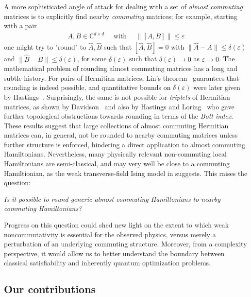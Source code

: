 \documentclass[a4paper,onecolumn,11pt]{quantumarticle}
\theoremstyle{plain}
\newcommand{\eps}{\varepsilon}
\begin{document}
A more sophisticated angle of attack for dealing with a set of \emph{almost commuting} matrices is to explicitly find nearby \emph{commuting} matrices; for example, starting with a pair
\begin{align}
A,B \in \mathbb{C}^{d \times d}\quad \text{ with } \quad \|[A,B]\| \leq \eps    
\end{align}
one might try to "round" to $\hat{A},\hat{B}$ such that $[\hat A,\hat B]=0$ with $\|\hat A-A\| \leq \delta(\eps)$ and
$\|\hat B-B\| \leq \delta(\eps)$, for some $\delta(\eps)$ such that $\delta(\eps) \rightarrow 0$ as $\eps \rightarrow 0$.
The mathematical problem of rounding almost commuting matrices has a long and subtle history.  For pairs of 
Hermitian matrices, Lin's theorem~\cite{Lin1997} guarantees that rounding is indeed possible, and
quantitative bounds on $\delta(\eps)$ were later given by Hastings~\cite{Hastings_2009,herrera2022hastingsapproachlinstheorem}.  
Surprisingly, the same is not possible for \emph{triplets} of Hermitian matrices, as shown by Davidson~\cite{Davidson1985} and also by 
Hastings and Loring~\cite{Hastings_2010} who gave further topological obstructions towards rounding in terms of the \emph{Bott index}. These results suggest that large collections of almost commuting Hermitian matrices can, in general, not be rounded to nearby commuting matrices unless further structure is enforced, hindering a direct application to almost commuting Hamiltonians. Nevertheless, many physically relevant non-commuting local Hamiltonians are semi-classical, and may very well be close to a commuting Hamiltionian, as the weak transverse-field Ising model in  suggests. This raises the question:
\begin{center}
\emph{Is it possible to round generic almost commuting Hamiltonians
to nearby commuting Hamiltonians?}
\end{center}



Progress on this question could shed new light on the extent to which weak noncommutativity is essential for the observed physics, versus merely a perturbation of an underlying commuting structure. Moreover, from a complexity perspective, it would allow us to better understand the boundary between classical satisfiability and inherently quantum optimization problems.



\subsection{Our contributions}
\end{document}

